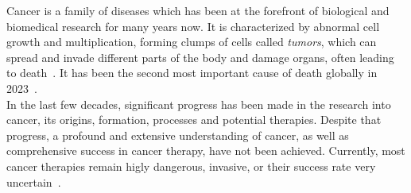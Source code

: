 
Cancer is a family of diseases which has been at the forefront of biological and biomedical research for many years now. It is characterized by abnormal cell growth and multiplication, forming clumps of cells called \textit{tumors}, which can spread and invade different parts of the body and damage organs, often leading to death~\cite{who-cancer}. It has been the second most important cause of death globally in 2023~\cite{owid-causes-of-death}.\\
In the last few decades, significant progress has been made in the research into cancer, its origins, formation, processes and potential therapies. Despite that progress, a profound and extensive understanding of cancer, as well as comprehensive success in cancer therapy, have not been achieved. Currently, most cancer therapies remain higly dangerous, invasive, or their success rate very uncertain~\cite{side-effects-cancer-treatments, narrative-review-heterogeneity-challenges}.

